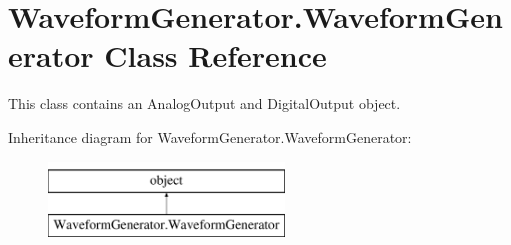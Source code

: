 \hypertarget{class_waveform_generator_1_1_waveform_generator}{\section{Waveform\-Generator.\-Waveform\-Generator Class Reference}
\label{class_waveform_generator_1_1_waveform_generator}
}


This class contains an Analog\-Output and Digital\-Output object.  


Inheritance diagram for Waveform\-Generator.\-Waveform\-Generator\-:\begin{figure}[H]
\begin{center}
\leavevmode
\includegraphics[height=2.000000cm]{class_waveform_generator_1_1_waveform_generator}
\end{center}
\end{figure}

